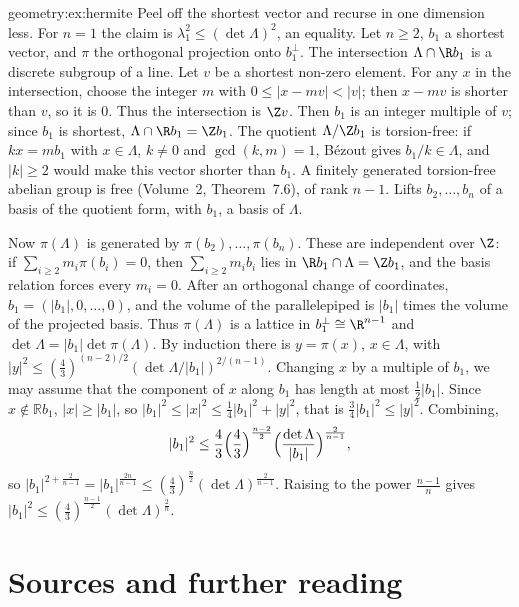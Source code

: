\begin{solution}{geometry:ex:hermite}
\idea Peel off the shortest vector and recurse in one dimension less.
\writeup For $n=1$ the claim is $\lambda_1^2\le(\det\Lambda)^2$, an equality. Let $n\ge2$, $b_1$ a shortest vector, and $\pi$ the orthogonal projection onto
$b_1^\perp$. The intersection $\Lambda\cap\R b_1$ is a discrete subgroup of a line. Let $v$ be a shortest non-zero element. For any $x$ in the intersection, choose the integer $m$ with $0\le|x-mv|<|v|$; then $x-mv$ is shorter than $v$, so it is $0$. Thus the intersection is $\Z v$. Then $b_1$ is an integer multiple of $v$; since $b_1$ is shortest, $\Lambda\cap\R b_1=\Z b_1$. The quotient $\Lambda/\Z b_1$ is torsion-free: if $kx=mb_1$ with $x\in\Lambda$, $k\ne0$ and $\gcd(k,m)=1$, B\'ezout gives $b_1/k\in\Lambda$, and $|k|\ge2$ would make this vector shorter than $b_1$. A finitely generated torsion-free abelian group is free (Volume~2, Theorem~7.6), of rank $n-1$. Lifts $b_2,\dots,b_n$ of a basis of the quotient form, with $b_1$, a basis of $\Lambda$.

Now $\pi(\Lambda)$ is generated by $\pi(b_2),\dots,\pi(b_n)$. These are independent over $\Z$: if $\sum_{i\ge2}m_i\pi(b_i)=0$, then $\sum_{i\ge2}m_ib_i$ lies in $\R b_1\cap\Lambda=\Z b_1$, and the basis relation forces every $m_i=0$. After an orthogonal change of coordinates, $b_1=(|b_1|,0,\dots,0)$, and the volume of the parallelepiped is $|b_1|$ times the volume of the projected basis. Thus $\pi(\Lambda)$ is a lattice in $b_1^\perp\cong\R^{n-1}$ and $\det\Lambda=|b_1|\det\pi(\Lambda)$. By induction there is $y=\pi(x)$, $x\in\Lambda$, with
$|y|^2\le(\frac43)^{(n-2)/2}(\det\Lambda/|b_1|)^{2/(n-1)}$. Changing $x$ by a multiple of $b_1$, we may assume that the component of $x$ along $b_1$ has length at most
$\frac12|b_1|$. Since $x\notin\mathbb Rb_1$, $|x|\ge|b_1|$, so $|b_1|^2\le|x|^2\le\frac14|b_1|^2+|y|^2$, that is $\frac34|b_1|^2\le|y|^2$. Combining,
\[
|b_1|^2\le\frac43\Bigl(\frac43\Bigr)^{\frac{n-2}2}\Bigl(\frac{\det\Lambda}{|b_1|}\Bigr)^{\frac2{n-1}},
\]
so $|b_1|^{2+\frac2{n-1}}=|b_1|^{\frac{2n}{n-1}}\le(\frac43)^{\frac n2}(\det\Lambda)^{\frac2{n-1}}$. Raising to the power $\frac{n-1}n$ gives
$|b_1|^2\le(\frac43)^{\frac{n-1}2}(\det\Lambda)^{\frac2n}$.
\end{solution}

\section*{Sources and further reading}

